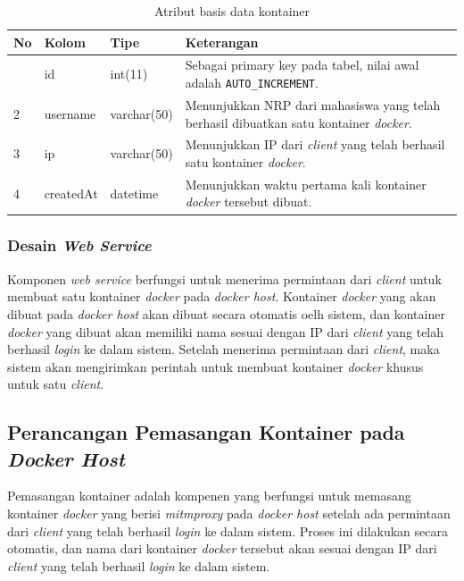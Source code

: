 	\begin{longtable}{|p{}|p{}|p{}|p{}|}
		\caption{Atribut basis data kontainer} \label{tabelkontainer} \\
		\hline
		\textbf{No} & \textbf{Kolom} & \textbf{Tipe} & \textbf{Keterangan} \\ \hline
		\endhead
		\endfoot
		\endlastfoot
		1 & id & int(11) & Sebagai primary key pada tabel, nilai awal adalah \texttt{AUTO\_INCREMENT}. \\ \hline
		2 & username & varchar(50) & Menunjukkan NRP dari mahasiswa yang telah berhasil dibuatkan satu kontainer \textit{docker}. \\ \hline
		3 & ip & varchar(50) & Menunjukkan IP dari \textit{client} yang telah berhasil satu kontainer \textit{docker}. \\ \hline
		4 & createdAt & datetime & Menunjukkan waktu pertama kali kontainer \textit{docker} tersebut dibuat. \\ \hline
		
	\end{longtable}
	
	
	\subsubsection{Desain \textit{Web Service}}
	Komponen \textit{web service} berfungsi untuk menerima permintaan dari \textit{client} untuk membuat satu kontainer \textit{docker} pada \textit{docker host}. Kontainer \textit{docker} yang akan dibuat pada \textit{docker host} akan dibuat secara otomatis oelh sistem, dan kontainer \textit{docker} yang dibuat akan memiliki nama sesuai dengan IP dari \textit{client} yang telah berhasil \textit{login} ke dalam sistem. Setelah menerima permintaan dari \textit{client}, maka sistem akan mengirimkan perintah untuk membuat kontainer \textit{docker} khusus untuk satu \textit{client}. 
   	
    \subsection{Perancangan Pemasangan Kontainer pada \textit{Docker Host}}
	Pemasangan kontainer adalah kompenen yang berfungsi untuk memasang kontainer \textit{docker} yang berisi \textit{mitmproxy} pada \textit{docker host} setelah ada permintaan dari \textit{client} yang telah berhasil \textit{login} ke dalam sistem. Proses ini dilakukan secara otomatis, dan nama dari kontainer \textit{docker} tersebut akan sesuai dengan IP dari \textit{client} yang telah berhasil \textit{login} ke dalam sistem.
	
